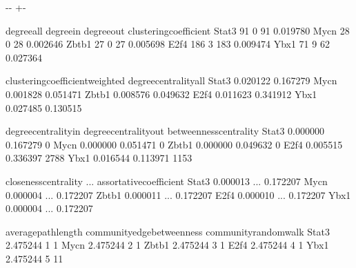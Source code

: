 \documentclass[letterpaper,10pt,english]{sphinxmanual}
\newlength\nbsphinxcodecellspacing
\begin{document}
{

\kern-\sphinxverbatimsmallskipamount\kern-\baselineskip
\kern+\FrameHeightAdjust\kern-\fboxrule
\vspace{\nbsphinxcodecellspacing}

%
\begin{sphinxVerbatim}[commandchars=\\\{\}]
\llap{\color{nbsphinxout}[57]:\,\hspace{\fboxrule}\hspace{\fboxsep}}       degree\PYGZus{}all  degree\PYGZus{}in  degree\PYGZus{}out  clustering\PYGZus{}coefficient  \PYGZbs{}
Stat3          91          0          91                0.019780
Mycn           28          0          28                0.002646
Zbtb1          27          0          27                0.005698
E2f4          186          3         183                0.009474
Ybx1           71          9          62                0.027364

       clustering\PYGZus{}coefficient\PYGZus{}weighted  degree\PYGZus{}centrality\PYGZus{}all  \PYGZbs{}
Stat3                         0.020122               0.167279
Mycn                          0.001828               0.051471
Zbtb1                         0.008576               0.049632
E2f4                          0.011623               0.341912
Ybx1                          0.027485               0.130515

       degree\PYGZus{}centrality\PYGZus{}in  degree\PYGZus{}centrality\PYGZus{}out  betweenness\PYGZus{}centrality  \PYGZbs{}
Stat3              0.000000               0.167279                       0
Mycn               0.000000               0.051471                       0
Zbtb1              0.000000               0.049632                       0
E2f4               0.005515               0.336397                    2788
Ybx1               0.016544               0.113971                    1153

       closeness\PYGZus{}centrality  ...  assortative\PYGZus{}coefficient  \PYGZbs{}
Stat3              0.000013  ...                \PYGZhy{}0.172207
Mycn               0.000004  ...                \PYGZhy{}0.172207
Zbtb1              0.000011  ...                \PYGZhy{}0.172207
E2f4               0.000010  ...                \PYGZhy{}0.172207
Ybx1               0.000004  ...                \PYGZhy{}0.172207

       average\PYGZus{}path\PYGZus{}length  community\PYGZus{}edge\PYGZus{}betweenness  community\PYGZus{}random\PYGZus{}walk  \PYGZbs{}
Stat3             2.475244                           1                      1
Mycn              2.475244                           2                      1
Zbtb1             2.475244                           3                      1
E2f4              2.475244                           4                      1
Ybx1              2.475244                           5                     11


\end{sphinxVerbatim}}
\end{document}

